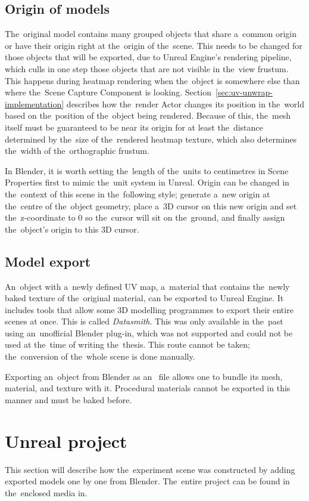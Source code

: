 \subsection{Origin of models}
\label{sec:blender-origins}
The~original model contains many grouped objects that share a~common origin or have their origin right at the~origin of the~scene. This needs to be changed for those objects that will be exported, due to Unreal Engine's rendering pipeline, which culls in one step those objects that are not visible in the~view frustum. This happens during heatmap rendering when the~object is somewhere else than where the~Scene Capture Component is looking. Section~\ref{sec:uv-unwrap-implementation} describes how the~render Actor changes its position in the~world based on the~position of the~object being rendered. Because of this, the~mesh itself must be guaranteed to be near its origin for at least the~distance determined by the~size of the~rendered heatmap texture, which also determines the~width of the~orthographic frustum.

In Blender, it is worth setting the~length of the~units to centimetres in Scene Properties first to mimic the~unit system in Unreal. Origin can be changed in the~context of this scene in the~following style; generate a~new origin at the~centre of the~object geometry, place a~3D cursor on this new origin and set the~z-coordinate to 0 so the~cursor will sit on the~ground, and finally assign the~object's origin to this 3D cursor.

\subsection{Model export}

An~object with a~newly defined UV map, a~material that contains the~newly baked texture of the~original material, can be exported to Unreal Engine. It includes tools that allow some 3D modelling programmes to export their entire scenes at once. This is called \emph{Datasmith}. This was only available in the~past using an~unofficial Blender plug-in, which was not supported and could not be used at the~time of writing the~thesis. This route cannot be taken; the~conversion of the~whole scene is done manually.

Exporting an~object from Blender as an~ file allows one to bundle its mesh, material, and texture with it. Procedural materials cannot be exported in this manner and must be baked before.

\section{Unreal project}
This section will describe how the~experiment scene was constructed by adding exported models one by one from Blender. The~entire project can be found in the~enclosed media in.

